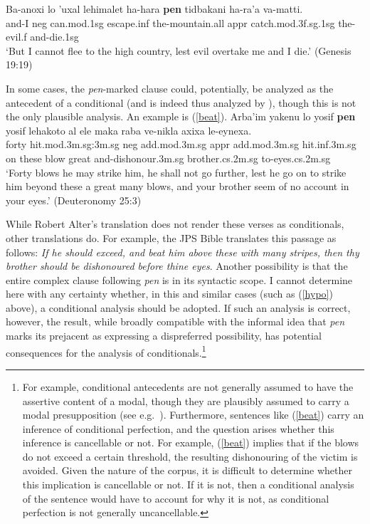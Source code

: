 \documentclass[output=paper,colorlinks,citecolor=brown]{langscibook}
\begin{document}
\ea
\label{lott} 
\gll Ba-anoxi lo 'uxal lehimalet ha-hara \textbf{pen} tidbakani ha-ra'a va-matti.\\
and-I {\sc neg} can.{\sc mod.1sg} escape.{\sc inf} the-mountain.{\sc all} {\sc appr} catch.{\sc mod.3f.sg.1sg} the-evil.{\sc f} and-die.{\sc 1sg}  \\
\glt `But I cannot flee to the high country, lest evil overtake me and I die.' (Genesis 19:19)
\z

In some cases, the \textit{pen}-marked clause could, potentially, be analyzed as the antecedent of a conditional (and is indeed thus analyzed by \citealt{azar81}), though this is not the only plausible analysis. An example is (\ref{beat}).
\ea
\label{beat} 
\gll Arba'im yakenu lo yosif \textbf{pen} yosif lehakoto al ele maka raba ve-nikla axixa le-eynexa.\\
 forty hit.{\sc mod}.{\sc 3m.sg}:{\sc 3m.sg} {\sc neg} add.{\sc mod.3m.sg} {\sc appr} add.{\sc mod.3m.sg} hit.{\sc inf}.{\sc 3m.sg} on these blow great and-dishonour.{\sc 3m.sg} brother.{\sc cs}.{\sc 2m.sg} to-eyes.{\sc cs}.{\sc 2m.sg} \\

\glt `Forty blows he may strike him, he shall not go further, lest he go on to strike him beyond these a great many blows, and your brother seem of no account in your eyes.' (Deuteronomy 25:3)
\z

\noindent While Robert Alter's translation does not render these verses as  conditionals, other translations do. For example, the JPS Bible translates this passage as follows:  \textit{If he should exceed, and beat him above these with many stripes, then thy brother should be dishonoured before thine eyes}. Another possibility is that the entire complex clause following \textit{pen} is in its syntactic scope. I cannot determine here with any certainty whether, in this and similar cases (such as (\ref{hypo}) above), a conditional analysis should be adopted. If such an analysis is correct, however, the result, while broadly compatible with the informal idea that \textit{pen} marks its prejacent as expressing a dispreferred possibility, has potential consequences for the analysis of conditionals.\footnote{For example, conditional antecedents are not generally assumed to have the assertive content of a modal, though they are plausibly assumed to carry a modal presupposition (see e.g.\ \citealt{leahy}). Furthermore, sentences like (\ref{beat}) carry an inference of conditional perfection, and the question arises whether this inference is cancellable or not. For example, (\ref{beat}) implies that if the blows do not exceed a certain threshold, the resulting dishonouring of the victim is avoided. Given the nature of the corpus, it is difficult to determine whether this implication is cancellable or not. If it is not, then a conditional analysis of the sentence would have to account for why it is not, as conditional perfection is not generally uncancellable.} 
\end{document}
